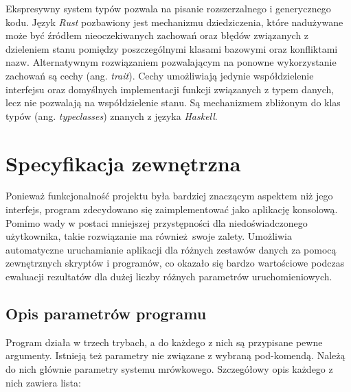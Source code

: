 {    Ekspresywny system typów pozwala na pisanie rozszerzalnego i generycznego kodu. Język \textit{Rust} pozbawiony jest
    mechanizmu dziedziczenia, które nadużywane może być źródłem nieoczekiwanych zachowań oraz błędów związanych z
    dzieleniem stanu pomiędzy poszczególnymi klasami bazowymi oraz konfliktami nazw. Alternatywnym rozwiązaniem
    pozwalającym na ponowne wykorzystanie zachowań są cechy (ang. \textit{trait}). Cechy umożliwiają jedynie
    współdzielenie interfejsu oraz domyślnych implementacji funkcji związanych z typem danych, lecz nie pozwalają na
    współdzielenie stanu. Są mechanizmem zbliżonym do klas typów (ang. \textit{typeclasses}) znanych z języka
    \textit{Haskell}.


    \section{Specyfikacja zewnętrzna}
    {
        Ponieważ funkcjonalność projektu była bardziej znaczącym aspektem niż jego interfejs, program zdecydowano się
        zaimplementować jako aplikację konsolową. Pomimo wady w postaci mniejszej przystępności dla niedoświadczonego
        użytkownika, takie rozwiązanie ma również swoje zalety. Umożliwia automatyczne uruchamianie aplikacji dla
        różnych zestawów danych za pomocą zewnętrznych skryptów i programów, co okazało się bardzo wartościowe podczas
        ewaluacji rezultatów dla dużej liczby różnych parametrów uruchomieniowych.

        \subsection{Opis parametrów programu}
        {
            Program działa w trzech trybach, a do każdego z nich są przypisane pewne argumenty. Istnieją też parametry
            nie związane z wybraną pod-komendą. Należą do nich głównie parametry systemu mrówkowego. Szczegółowy opis
            każdego z nich zawiera lista:

}}}
